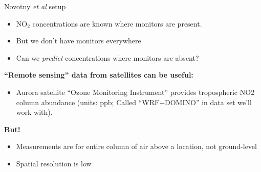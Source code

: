 \documentclass[aspectratio=169]{beamer}
\begin{document}
\begin{frame}{Novotny \textit{et al} setup}

\begin{itemize}
\item NO$_2$ concentrations are known where monitors are present.  
\item But we don't have monitors everywhere
\item Can we \textit{predict} concentrations where monitors are absent?
\end{itemize}

\textbf{``Remote sensing'' data from satellites can be useful:}
\begin{itemize}
\item Aurora satellite ``Ozone Monitoring Instrument'' provides tropospheric NO2 column abundance (units: ppb; Called ``WRF+DOMINO'' in data set we'll work with).
\end{itemize}
\textbf{But!}
\begin{itemize}
\item Measurements are for entire column of air above a location, not ground-level
\item Spatial resolution is low
\end{itemize}
\end{frame}
\end{document}

